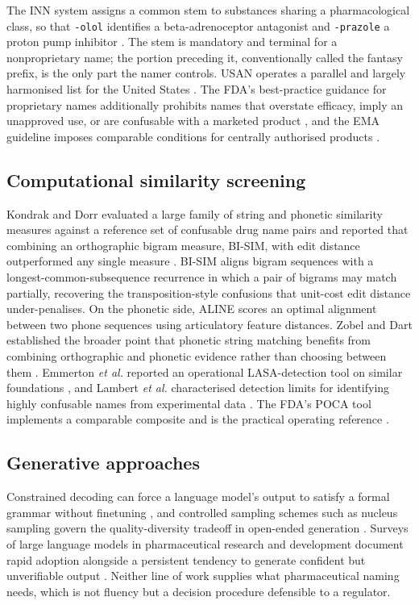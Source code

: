 \documentclass[conference]{IEEEtran}
\newcommand{\code}[1]{\texttt{\footnotesize #1}}
\begin{document}
The INN system assigns a common stem to substances sharing a pharmacological
class, so that \code{-olol} identifies a beta-adrenoceptor antagonist and
\code{-prazole} a proton pump inhibitor \cite{whostem}. The stem is mandatory
and terminal for a nonproprietary name; the portion preceding it, conventionally
called the fantasy prefix, is the only part the namer controls. USAN operates a
parallel and largely harmonised list for the United States \cite{usanstems}. The
FDA's best-practice guidance for proprietary names additionally prohibits names
that overstate efficacy, imply an unapproved use, or are confusable with a
marketed product \cite{fdaguidance}, and the EMA guideline imposes comparable
conditions for centrally authorised products \cite{emaguideline}.

\subsection{Computational similarity screening}

Kondrak and Dorr evaluated a large family of string and phonetic similarity
measures against a reference set of confusable drug name pairs and reported that
combining an orthographic bigram measure, BI-SIM, with edit distance outperformed
any single measure \cite{kondrak2006,kondrak2004}. BI-SIM aligns bigram sequences
with a longest-common-subsequence recurrence in which a pair of bigrams may match
partially, recovering the transposition-style confusions that unit-cost edit
distance \cite{levenshtein1966} under-penalises. On the phonetic side, ALINE
\cite{kondrak2000} scores an optimal alignment between two phone sequences using
articulatory feature distances. Zobel and Dart established the broader point that
phonetic string matching benefits from combining orthographic and phonetic
evidence rather than choosing between them \cite{zobel1996}. Emmerton
\textit{et al.} reported an operational LASA-detection tool on similar
foundations \cite{emmerton2020}, and Lambert \textit{et al.} characterised
detection limits for identifying highly confusable names from experimental data
\cite{lambert2015}. The FDA's POCA tool implements a comparable composite and is
the practical operating reference \cite{fdapoca}.

\subsection{Generative approaches}

Constrained decoding can force a language model's output to satisfy a formal
grammar without finetuning \cite{geng2023}, and controlled sampling schemes such
as nucleus sampling govern the quality-diversity tradeoff in open-ended
generation \cite{holtzman2020}. Surveys of large language models in
pharmaceutical research and development document rapid adoption alongside a
persistent tendency to generate confident but unverifiable output
\cite{liu2024}. Neither line of work supplies what pharmaceutical naming needs,
which is not fluency but a decision procedure defensible to a regulator.
\end{document}
